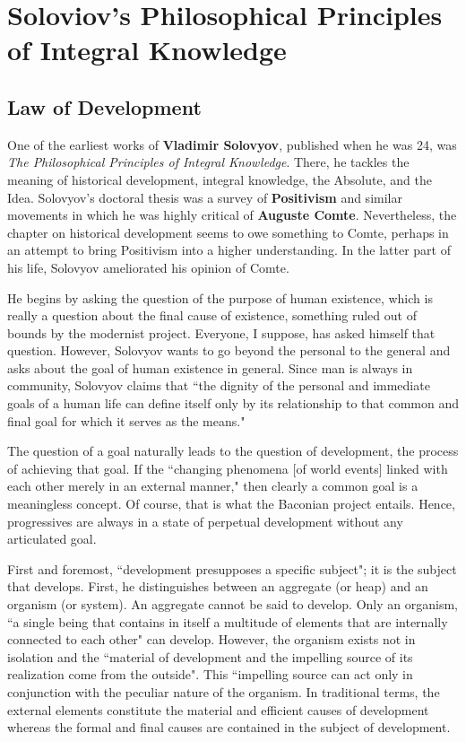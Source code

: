 \section{Soloviov's Philosophical Principles of Integral Knowledge}
\subsection{Law of Development}
One of the earliest works of \textbf{Vladimir Solovyov}, published when he was 24, was \textit{The Philosophical Principles of Integral Knowledge}. There, he tackles the meaning of historical development, integral knowledge, the Absolute, and the Idea. Solovyov's doctoral thesis was a survey of \textbf{Positivism} and similar movements in which he was highly critical of \textbf{Auguste Comte}. Nevertheless, the chapter on historical development seems to owe something to Comte, perhaps in an attempt to bring Positivism into a higher understanding. In the latter part of his life, Solovyov ameliorated his opinion of Comte.

He begins by asking the question of the purpose of human existence, which is really a question about the final cause of existence, something ruled out of bounds by the modernist project. Everyone, I suppose, has asked himself that question. However, Solovyov wants to go beyond the personal to the general and asks about the goal of human existence in general. Since man is always in community, Solovyov claims that ``the dignity of the personal and immediate goals of a human life can define itself only by its relationship to that common and final goal for which it serves as the means."

The question of a goal naturally leads to the question of development, the process of achieving that goal. If the ``changing phenomena [of world events] linked with each other merely in an external manner," then clearly a common goal is a meaningless concept. Of course, that is what the Baconian project entails. Hence, progressives are always in a state of perpetual development without any articulated goal.

First and foremost, ``development presupposes a specific subject"; it is the subject that develops. First, he distinguishes between an aggregate (or heap) and an organism (or system). An aggregate cannot be said to develop. Only an organism, ``a single being that contains in itself a multitude of elements that are internally connected to each other" can develop. However, the organism exists not in isolation and the ``material of development and the impelling source of its realization come from the outside". This ``impelling source can act only in conjunction with the peculiar nature of the organism. In traditional terms, the external elements constitute the material and efficient causes of development whereas the formal and final causes are contained in the subject of development.

